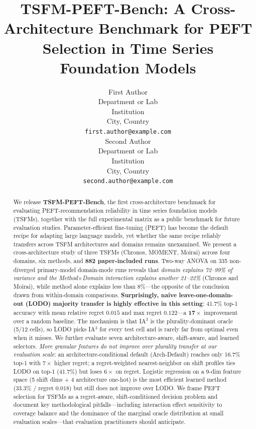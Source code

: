 \documentclass{article}
\title{TSFM-PEFT-Bench: A Cross-Architecture Benchmark for PEFT Selection in Time Series Foundation Models}
\author{%
First Author \\
Department or Lab \\
Institution \\
City, Country \\
\texttt{first.author@example.com} \\
\And
Second Author \\
Department or Lab \\
Institution \\
City, Country \\
\texttt{second.author@example.com}
}
\date{}
\begin{document}
\maketitle

\begin{abstract}
We release \textbf{TSFM-PEFT-Bench}, the first cross-architecture benchmark for evaluating PEFT-recommendation reliability in time series foundation models (TSFMs), together with the full experimental matrix as a public benchmark for future evaluation studies. Parameter-efficient fine-tuning (PEFT) has become the default recipe for adapting large language models, yet whether the same recipe reliably transfers across TSFM architectures and domains remains unexamined. We present a cross-architecture study of three TSFMs (Chronos, MOMENT, Moirai) across four domains, six methods, and \textbf{882 paper-included runs}. Two-way ANOVA on 335 non-diverged primary-model domain-mode runs reveals that \emph{domain explains 72--99\% of variance and the Method$\times$Domain interaction explains another 21--22\%} (Chronos and Moirai), while method alone explains less than 8\%---the opposite of the conclusion drawn from within-domain comparisons. \textbf{Surprisingly, naive leave-one-domain-out (LODO) majority transfer is highly effective in this setting}: 41.7\% top-1 accuracy with mean relative regret $0.015$ and max regret $0.122$---a $\mathbf{17{\times}}$ improvement over a random baseline. The mechanism is that IA$^3$ is the plurality-dominant oracle (5/12 cells), so LODO picks IA$^3$ for every test cell and is rarely far from optimal even when it misses. We further evaluate seven architecture-aware, shift-aware, and learned selectors. \emph{More granular features do not improve over plurality transfer at our evaluation scale}: an architecture-conditional default (Arch-Default) reaches only 16.7\% top-1 with $7{\times}$ higher regret; a regret-weighted nearest-neighbor on shift profiles ties LODO on top-1 (41.7\%) but loses $6{\times}$ on regret. Logistic regression on a 9-dim feature space (5 shift dims + 4 architecture one-hot) is the most efficient learned method (33.3\% / regret $0.018$) but still does not improve over LODO. We frame PEFT selection for TSFMs as a regret-aware, shift-conditioned decision problem and document key methodological pitfalls---including interaction effect sensitivity to coverage balance and the dominance of the marginal oracle distribution at small evaluation scales---that evaluation practitioners should anticipate.
\end{abstract}
\end{document}
